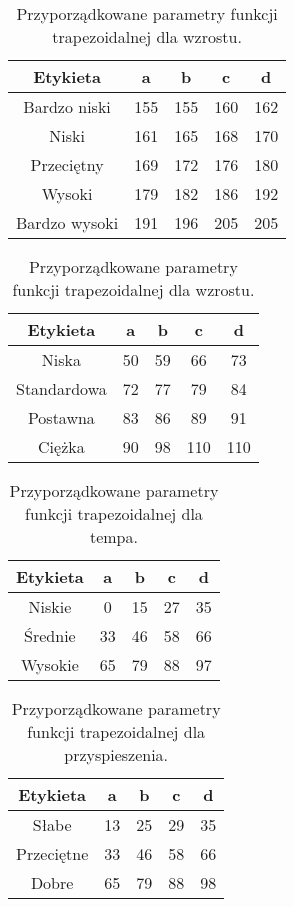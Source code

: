 \documentclass{classrep}
\begin{document}
\begin{table}[H]
	\centering
	\begin{tabular}{c c c c c} 
		\hline
		\textbf{Etykieta} & \textbf{a} & \textbf{b} & \textbf{c} &  \textbf{d} \\ [0.5ex] 
		\hline
		\hline 
		Bardzo niski & 155 & 155 & 160 & 162 \\ 
		Niski & 161 & 165 & 168 & 170 \\
		Przeciętny & 169 & 172 & 176 & 180 \\
		Wysoki & 179 & 182 & 186 & 192\\
		Bardzo wysoki & 191 & 196 & 205 & 205\\
		\hline
	\end{tabular}
	\caption{Przyporządkowane parametry funkcji trapezoidalnej dla wzrostu.}
\end{table}

\begin{table}[H]
	\centering
	\begin{tabular}{c c c c c} 
		\hline
		\textbf{Etykieta} & \textbf{a} & \textbf{b} & \textbf{c} &  \textbf{d} \\ [0.5ex] 
		\hline
		\hline 
		Niska & 50 & 59 & 66 & 73 \\ 
		Standardowa & 72 & 77 & 79 & 84 \\
		Postawna & 83 & 86 & 89 & 91 \\
		Ciężka & 90 & 98 & 110 & 110\\
		\hline
	\end{tabular}
	\caption{Przyporządkowane parametry funkcji trapezoidalnej dla wzrostu.}
\end{table}

\begin{table}[H]
	\centering
	\begin{tabular}{c c c c c} 
		\hline
		\textbf{Etykieta} & \textbf{a} & \textbf{b} & \textbf{c} &  \textbf{d} \\ [0.5ex] 
		\hline
		\hline 
		Niskie & 0 & 15 & 27 & 35 \\ 
		Średnie & 33 & 46 & 58 & 66 \\
		Wysokie & 65 & 79 & 88 & 97 \\
		\hline
	\end{tabular}
	\caption{Przyporządkowane parametry funkcji trapezoidalnej dla tempa.}
\end{table}

\begin{table}[H]
	\centering
	\begin{tabular}{c c c c c} 
		\hline
		\textbf{Etykieta} & \textbf{a} & \textbf{b} & \textbf{c} &  \textbf{d} \\ [0.5ex] 
		\hline
		\hline 
		Słabe & 13 & 25 & 29 & 35 \\ 
		Przeciętne & 33 & 46 & 58 & 66 \\
		Dobre & 65 & 79 & 88 & 98 \\
		\hline
	\end{tabular}
	\caption{Przyporządkowane parametry funkcji trapezoidalnej dla przyspieszenia.}
\end{table}
\end{document}
